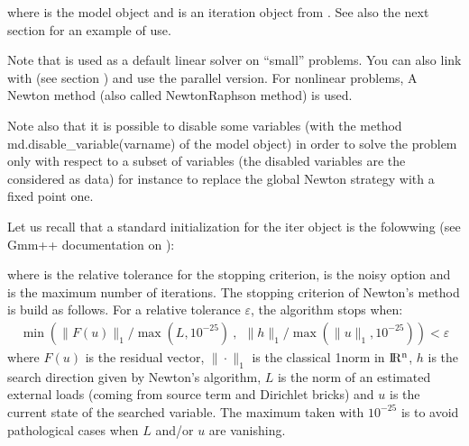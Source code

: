 \documentclass[a4paper,11pt,english]{sphinxmanual}
\begin{document}
\begin{sphinxVerbatim}[commandchars=\\\{\}]
 
\end{sphinxVerbatim}

where  is the model object and  is an iteration object from .
See also the next section for an example of use.

Note that  is used as a default linear solver on “small” problems. You can also link  with  (see section {\hyperref[\detokenize{userdoc/linalg:ud-linalg}]{}}) and use the parallel version. For nonlinear problems, A Newton method (also called Newton\sphinxhyphen{}Raphson method) is used.

Note also that it is possible to disable some variables
(with the method md.disable\_variable(varname) of the model object) in order to
solve the problem only with respect to a subset of variables (the
disabled variables are the considered as data) for instance to
replace the global Newton strategy with a fixed point one.

Let us recall that a standard initialization for the iter object is the folowwing (see Gmm++ documentation on ):

\begin{sphinxVerbatim}[commandchars=\\\{\}]
   
\end{sphinxVerbatim}

where  is the relative tolerance for the stopping criterion,  is the noisy option and  is the maximum number of iterations. The stopping criterion of Newton’s method is build as follows. For a relative tolerance \(\varepsilon\), the algorithm stops when:
\begin{equation*}
\begin{split}\min\left( \|F(u)\|_1 / \max(L, 10^{-25}) ~, ~~ \|h\|_1 / \max(\|u\|_1, 10^{-25})\right) < \varepsilon\end{split}
\end{equation*}
where \(F(u)\) is the residual vector, \(\|\cdot\|_1\) is the classical 1\sphinxhyphen{}norm in \(\rm I\hspace{-0.15em}R^n\), \(h\) is the search direction given by Newton’s algorithm, \(L\) is the norm of an estimated external loads (coming from source term and Dirichlet bricks) and \(u\) is the current state of the searched variable. The maximum taken with \(10^{-25}\) is to avoid pathological cases when \(L\) and/or \(u\) are vanishing.
\end{document}
